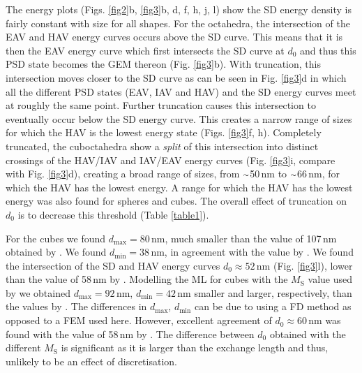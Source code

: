 \documentclass[review,authoryear]{elsarticle}
\newcommand{\roughly}{{\raise.17ex\hbox{$\scriptstyle\sim$}}}
\newcommand{\dmax}{d_\text{max}}
\newcommand{\dmin}{d_\text{min}}
\newcommand{\nm}{\,\text{nm}}
\begin{document}
The energy plots (Figs. \ref{fig2}b, \ref{fig3}b, d, f, h, j, l) show the SD energy density is fairly constant with size for all shapes. For the octahedra, the intersection of the EAV and HAV energy curves occurs above the SD curve. This means that it is then the EAV energy curve which first intersects the SD curve at $d_0$ and thus this PSD state becomes the GEM thereon (Fig. \ref{fig3}b). With truncation, this intersection moves closer to the SD curve as can be seen in Fig. \ref{fig3}d in which all the different PSD states (EAV, IAV and HAV) and the SD energy curves meet at roughly the same point. Further truncation causes this intersection to eventually occur below the SD energy curve. This creates a narrow range of sizes for which the HAV is the lowest energy state (Figs. \ref{fig3}f, h). Completely truncated, the cuboctahedra show a \textit{split} of this intersection into distinct crossings of the HAV/IAV and IAV/EAV energy curves (Fig. \ref{fig3}i, compare with Fig. \ref{fig3}d), creating a broad range of sizes, from $\roughly$50$\nm$ to $\roughly$66$\nm$, for which the HAV has the lowest energy. A range for which the HAV has the lowest energy was also found for spheres and cubes. The overall effect of truncation on $d_0$ is to decrease this threshold (Table \ref{table1}).\par

For the cubes we found $\dmax=80\,\text{nm}$, much smaller than the value of 107$\nm$ obtained by \citet{Muxworthy2013}. We found $\dmin=38\,\text{nm}$, in agreement with the value by \citet{Muxworthy2013}. We found the intersection of the SD and HAV energy curves $d_0\approx 52\,\text{nm}$ (Fig. \ref{fig3}l), lower than the value of 58$\nm$ by \citet{Muxworthy2013}. Modelling the ML for cubes with the $M_\text{S}$ value used by \citet{Muxworthy2013} we obtained $\dmax=92\,\text{nm}$, $\dmin=42\,\text{nm}$ smaller and larger, respectively, than the values by \citet{Muxworthy2013}. The differences in $\dmax$, $\dmin$ can be due to \citet{Muxworthy2013} using a FD method as opposed to a FEM used here. However, excellent agreement of $d_0\approx 60\,\text{nm}$ was found with the value of 58$\nm$ by \citet{Muxworthy2013}. The difference between $d_0$ obtained with the different $M_\text{S}$ is significant as it is larger than the exchange length and thus, unlikely to be an effect of discretisation.\par
\end{document}
